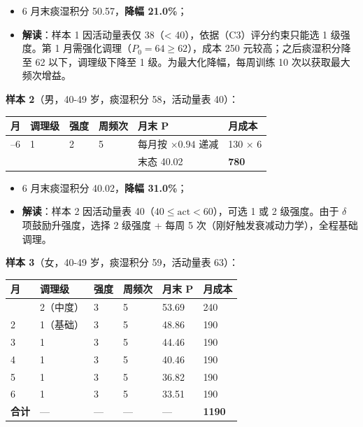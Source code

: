 \documentclass{MathorCupmodeling}
\providecommand{\tightlist}{%
  \setlength{\itemsep}{0pt}\setlength{\parskip}{0pt}}
\begin{document}
\begin{itemize}
\tightlist
\item
  6 月末痰湿积分 50.57，\textbf{降幅 21.0\%}；
\item
  \textbf{解读}：样本 1 因活动量表仅 38（\textless{} 40），依据（C3）评分约束只能选 1 级强度。第 1 月需强化调理（\(P_0 = 64 \ge 62\)），成本 250 元较高；之后痰湿积分降至 62 以下，调理级下降至 1 级。为最大化降幅，每周训练 10 次以获取最大频次增益。
\end{itemize}

\textbf{样本 2}（男，40-49 岁，痰湿积分 58，活动量表 40）：

\begin{longtable}[]{@{}llllll@{}}
\toprule\noalign{}
月 & 调理级 & 强度 & 周频次 & 月末 P & 月成本 \\
\midrule\noalign{}
\endhead
\bottomrule\noalign{}
\endlastfoot
1--6 & 1 & 2 & 5 & 每月按 \(\times 0.94\) 递减 & 130 × 6 \\
& & & & 末态 40.02 & \textbf{780} \\
\end{longtable}

\begin{itemize}
\tightlist
\item
  6 月末痰湿积分 40.02，\textbf{降幅 31.0\%}；
\item
  \textbf{解读}：样本 2 因活动量表 40（\(40 \le \text{act} < 60\)），可选 1 或 2 级强度。由于 \(\delta\) 项鼓励升强度，选择 2 级强度 + 每周 5 次（刚好触发衰减动力学），全程基础调理。
\end{itemize}

\textbf{样本 3}（女，40-49 岁，痰湿积分 59，活动量表 63）：

\begin{longtable}[]{@{}llllll@{}}
\toprule\noalign{}
月 & 调理级 & 强度 & 周频次 & 月末 P & 月成本 \\
\midrule\noalign{}
\endhead
\bottomrule\noalign{}
\endlastfoot
1 & 2（中度） & 3 & 5 & 53.69 & 240 \\
2 & 1（基础） & 3 & 5 & 48.86 & 190 \\
3 & 1 & 3 & 5 & 44.46 & 190 \\
4 & 1 & 3 & 5 & 40.46 & 190 \\
5 & 1 & 3 & 5 & 36.82 & 190 \\
6 & 1 & 3 & 5 & 33.51 & 190 \\
\textbf{合计} & --- & --- & --- & --- & \textbf{1190} \\
\end{longtable}
\end{document}
